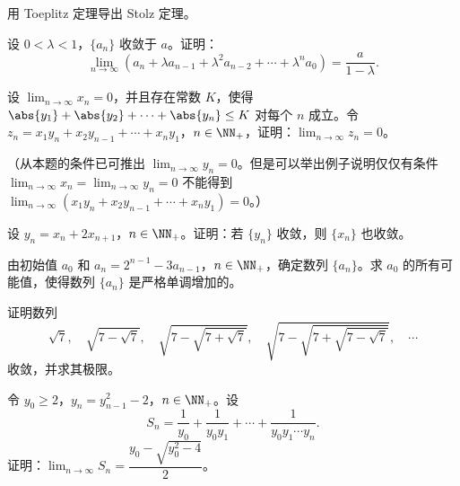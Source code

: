 \begin{xreferenceproblem}[11]
用 Toeplitz 定理导出 Stolz 定理。
\end{xreferenceproblem}

\begin{xreferenceproblem}[12]
设 $0<\lambda<1$，$\{a_n\}$ 收敛于 $a$。证明：
  \[
    \lim_{n\to\infty}(a_n+\lambda a_{n-1}+\lambda^2a_{n-2}+\cdots+\lambda^na_0)
    =\frac a{1-\lambda}.
  \]
\end{xreferenceproblem}

\begin{xreferenceproblem}[13]
设 $\displaystyle\lim_{n\to\infty}x_n=0$，并且存在常数 $K$，使得 $\abs{y_1}+\abs{y_2}+\cdots+\abs{y_n}\le K$ 对每个 $n$ 成立。令 $z_n=x_1y_n+x_2y_{n-1}+\cdots+x_ny_1$，$n\in\NN_+$，证明：$\displaystyle\lim_{n\to\infty}z_n=0$。

  （从本题的条件已可推出 $\displaystyle\lim_{n\to\infty}y_n=0$。但是可以举出例子说明仅仅有条件 $\displaystyle\lim_{n\to\infty}x_n=\displaystyle\lim_{n\to\infty}y_n=0$ 不能得到 $\displaystyle\lim_{n\to\infty}(x_1y_n+x_2y_{n-1}+\cdots+x_ny_1)=0$。）
\end{xreferenceproblem}

\begin{xreferenceproblem}[14]
设 $y_n=x_n+2x_{n+1}$，$n\in\NN_+$。证明：若 $\{y_n\}$ 收敛，则 $\{x_n\}$ 也收敛。
\end{xreferenceproblem}

\begin{xreferenceproblem}[15]
由初始值 $a_0$ 和 $a_n=2^{n-1}-3a_{n-1}$，$n\in\NN_+$，确定数列 $\{a_n\}$。求 $a_0$ 的所有可能值，使得数列 $\{a_n\}$ 是严格单调增加的。
\end{xreferenceproblem}

\begin{xreferenceproblem}[16]
证明数列
  \[
    \sqrt7,\quad\sqrt{7-\sqrt7},\quad
    \sqrt{7-\sqrt{7+\sqrt7}},\quad
    \sqrt{7-\sqrt{7+\sqrt{7-\sqrt7}}},\quad\cdots
  \]
  收敛，并求其极限。
\end{xreferenceproblem}

\begin{xreferenceproblem}[17]
令 $y_0\ge2$，$y_n=y_{n-1}^2-2$，$n\in\NN_+$。设
  \[
    S_n=\frac1{y_0}+\frac1{y_0y_1}+\cdots+\frac1{y_0y_1\cdots y_n}.
  \]
  证明：$\displaystyle\lim_{n\to\infty}S_n=\dfrac{y_0-\sqrt{y_0^2-4}}2$。
\end{xreferenceproblem}

